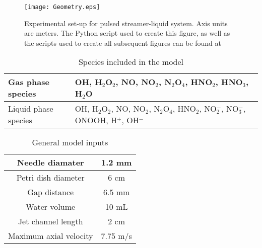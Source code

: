 \documentclass[12pt]{article}
\begin{document}
\begin{figure}[htb]
    \centering
        \texttt{[image: Geometry.eps]}
    \caption{Experimental set-up for pulsed streamer-liquid system. Axis units are meters. The Python script used to create this figure, as well as the scripts used to create all subsequent figures can be found at \cite{scriptsLocation}}
    \label{fig:model_geom}
\end{figure}

\begin{table}[htpb]
    \begin{center}
        \begin{tabular}{|l| p{10cm}|}
            \hline
            Gas phase species & OH, H$_2$O$_2$, NO, NO$_2$, N$_2$O$_4$, HNO$_2$, HNO$_3$, H$_2$O \\
            \hline
            Liquid phase species & OH, H$_2$O$_2$, NO, NO$_2$, N$_2$O$_4$, HNO$_2$, NO$_2^-$, NO$_3^-$, ONOOH, H$^+$, OH$^-$ \\
            \hline
        \end{tabular}
    \end{center}
    \caption{Species included in the model}
    \label{tab:species_list}
\end{table}


\begin{table}[htpb]
    \begin{center}
        \begin{tabular}{|c |c |}
        \hline
        Needle diamater & 1.2 mm \\
        \hline
        Petri dish diameter & 6 cm \\
        \hline
        Gap distance & 6.5 mm \\
        \hline
        Water volume & 10 mL \\
        \hline
        Jet channel length & 2 cm \\
        \hline
        Maximum axial velocity & 7.75 m/s \\
        \hline
        \end{tabular}
    \end{center}
    \caption{General model inputs}
    \label{tab:gen_inputs}
\end{table}
       
\end{document}
